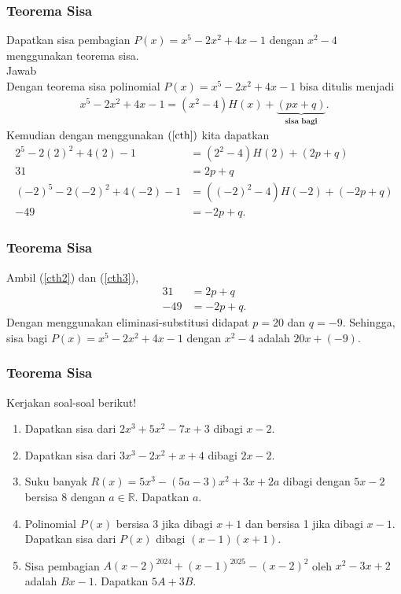 \documentclass[11pt]{beamer}
\begin{document}
	\begin{frame}
		\frametitle{Teorema Sisa}
		Dapatkan sisa pembagian $P(x)=x^5-2x^2+4x-1$ dengan $x^2-4$ menggunakan teorema sisa. \\Jawab\\
		Dengan teorema sisa polinomial $P(x)=x^5-2x^2+4x-1$ bisa ditulis menjadi
		\begin{align}
			x^5-2x^2+4x-1=(x^2-4)H(x)+\underbrace{(px+q)}_{\textbf{sisa bagi}}.\label{cth}
		\end{align}
		Kemudian dengan menggunakan $(\ref{cth})$ kita dapatkan 
		\begin{align}
			2^5-2(2)^2+4(2)-1&=(2^2-4)H(2)+(2p+q)\nonumber \\
				31&=2p+q \label{cth2} \\ 
			(-2)^5-2(-2)^2+4(-2)-1&=((-2)^2-4)H(-2)+(-2p+q)\nonumber \\
				-49&=-2p+q. \label{cth3}
		\end{align}		
		
	\end{frame}
		
	\begin{frame}
		\frametitle{Teorema Sisa}
		Ambil (\ref{cth2}) dan (\ref{cth3}),
		\begin{align*}
			31&=2p+q\\
			-49&=-2p+q.
		\end{align*}
		Dengan menggunakan eliminasi-substitusi didapat $p=20$ dan $q=-9$. Sehingga, sisa bagi $P(x)=x^5-2x^2+4x-1$ dengan $x^2-4$ adalah $20x+(-9)$.	
	\end{frame}	
		
	\begin{frame}
		\frametitle{Teorema Sisa}
		Kerjakan soal-soal berikut!
		\begin{enumerate}
			\item Dapatkan sisa dari $2x^3+5x^2-7x+3$ dibagi $x-2$.
			\item Dapatkan sisa dari $3x^3-2x^2+x+4$ dibagi $2x-2$.
			\item Suku banyak $R(x)=5x^3-(5a-3)x^2+3x+2a$ dibagi dengan $5x-2$ bersisa 8 dengan $a\in \mathbb{R}$. Dapatkan $a$.
			\item Polinomial $P(x)$ bersisa 3 jika dibagi $x+1$ dan bersisa 1 jika dibagi $x-1$. Dapatkan sisa dari $P(x)$ dibagi $(x-1)(x+1)$.
			\item Sisa pembagian $A(x-2)^{2024}+(x-1)^{2025}-(x-2)^2$ oleh $x^2-3x+2$ adalah $Bx-1$. Dapatkan $5A+3B$. 
			
		\end{enumerate}
	\end{frame}	
	
\end{document}
